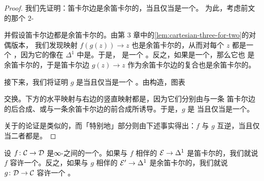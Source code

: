 \begin{proof}
我们先证明：笛卡尔边是余笛卡尔的，当且仅当\trCounit{}是一个\trEquivalence{}。
为此，考虑前文的那个 $2$-\trSimplex{}%
\begin{center}
\end{center}
并假设笛卡尔边都是余笛卡尔的。由第 3 章中的\cref{lem:cartesian-three-for-two}的对偶版本，
我们发现\trCounit{}映射 $f(g(z)) \to z$ 也是余笛卡尔的，从而对每个 $z$ 都是一个%
\trEquivalence{}，因为它的像在 $\Delta^1$ 中是\trInvertible{}。于是，%
\trCounit{}是一个%
\trNaturalEquivalence{}。反之，如果\trCounit{}是一个\trEquivalence{}，那么它也
是余笛卡尔的，于是笛卡尔边 $g(z) \to z$ 作为余笛卡尔边的复合也是余笛卡尔的。

接下来，我们将证明 $g$ 是\trFullyFaithful{}当且仅当\trCounit{}是一个%
\trEquivalence{}。由构造，图表
\begin{center}
\end{center}
交换。下方的水平映射与右边的竖直映射都是\trEquivalence{}，因为它们分别由与一条
笛卡尔边的后合成、或与一条余笛卡尔边的前合成所诱导。于是，$g$ 是%
\trFullyFaithful{}当且仅当\trCounit{}是一个\trEquivalence{}。

关于\trUnit{}的论证是类似的，而「特别地」部分则由下述事实得出：$f$ 与 $g$
互逆，当且仅当二者都是\trFullyFaithful{}。
\end{proof}

\begin{definition}\label{def:admit-adjoint-fibration}
设 $f\colon \mathcal{C} \to \mathcal{D}$ 是∞-\trCategories{}之间的一个\trFunctor{}。如果与 $f$
相伴的\trCocartesianFibration{} $\mathcal{E} \to \Delta^1$ 是笛卡尔的，我们就说 $f$
容许一个\trRightAdjoint{}。反之，如果与 $g$ 相伴的\trCartesianFibration{}%
$\mathcal{E}' \to \Delta^1$ 是余笛卡尔的，我们就说 $g\colon \mathcal{D} \to \mathcal{C}$ 容许一个%
\trLeftAdjoint{}。
\end{definition}

